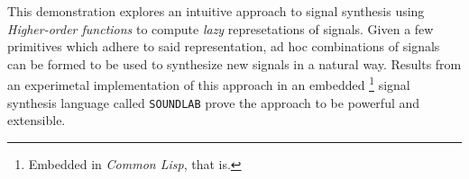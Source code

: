 This demonstration explores an intuitive approach to signal synthesis
using \textit{Higher-order functions} to compute \textit{lazy}
represetations of signals. Given a few primitives which adhere to said
representation, ad hoc combinations of signals can be formed to be used
to synthesize new signals in a natural way. Results from an experimetal
implementation of this approach in an embedded \footnote{Embedded in
\textit{Common Lisp}, that is.} signal synthesis language called
\texttt{SOUNDLAB} prove the approach to be powerful and extensible.
